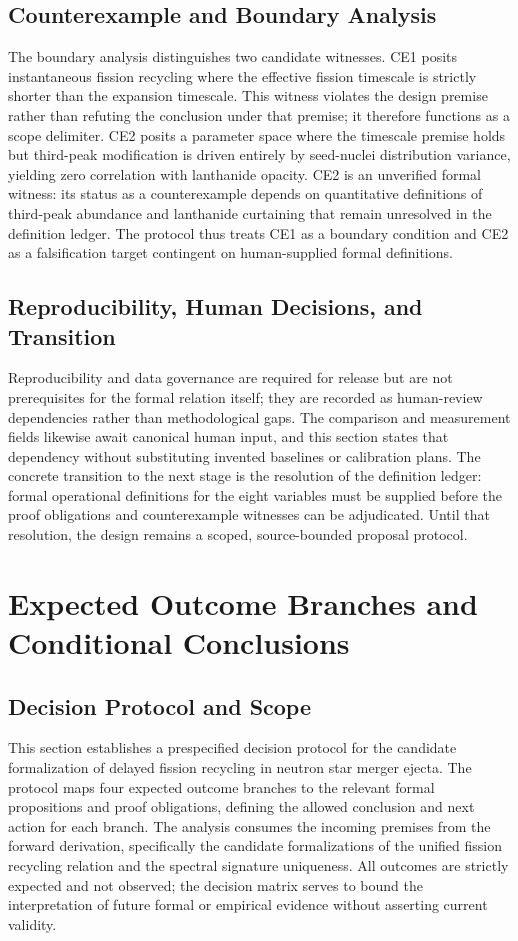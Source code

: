 \documentclass[conference]{IEEEtran}
\begin{document}
\subsection{Counterexample and Boundary Analysis}
The boundary analysis distinguishes two candidate witnesses. CE1 posits instantaneous fission recycling where the effective fission timescale is strictly shorter than the expansion timescale. This witness violates the design premise rather than refuting the conclusion under that premise; it therefore functions as a scope delimiter. CE2 posits a parameter space where the timescale premise holds but third-peak modification is driven entirely by seed-nuclei distribution variance, yielding zero correlation with lanthanide opacity. CE2 is an unverified formal witness: its status as a counterexample depends on quantitative definitions of third-peak abundance and lanthanide curtaining that remain unresolved in the definition ledger. The protocol thus treats CE1 as a boundary condition and CE2 as a falsification target contingent on human-supplied formal definitions.

\subsection{Reproducibility, Human Decisions, and Transition}
Reproducibility and data governance are required for release but are not prerequisites for the formal relation itself; they are recorded as human-review dependencies rather than methodological gaps. The comparison and measurement fields likewise await canonical human input, and this section states that dependency without substituting invented baselines or calibration plans. The concrete transition to the next stage is the resolution of the definition ledger: formal operational definitions for the eight variables must be supplied before the proof obligations and counterexample witnesses can be adjudicated. Until that resolution, the design remains a scoped, source-bounded proposal protocol.

\section{Expected Outcome Branches and Conditional Conclusions}
\subsection{Decision Protocol and Scope}
This section establishes a prespecified decision protocol for the candidate formalization of delayed fission recycling in neutron star merger ejecta. The protocol maps four expected outcome branches to the relevant formal propositions and proof obligations, defining the allowed conclusion and next action for each branch. The analysis consumes the incoming premises from the forward derivation, specifically the candidate formalizations of the unified fission recycling relation and the spectral signature uniqueness. All outcomes are strictly expected and not observed; the decision matrix serves to bound the interpretation of future formal or empirical evidence without asserting current validity.
\end{document}
